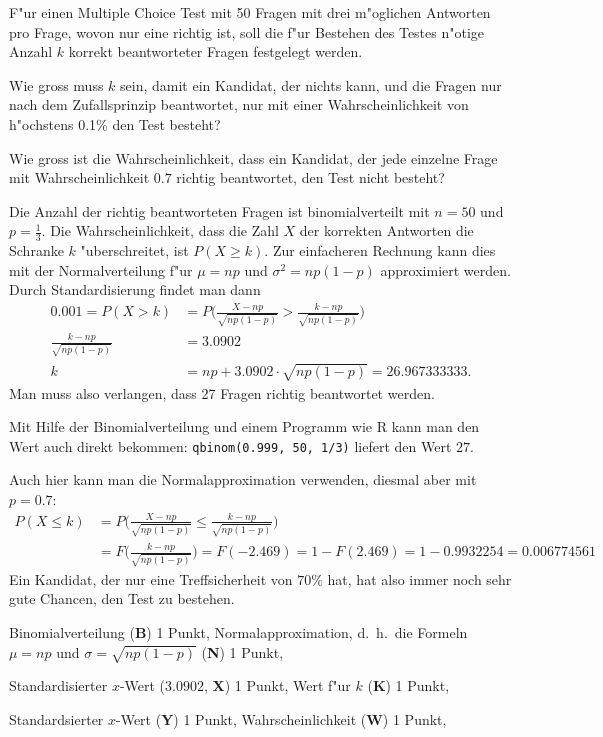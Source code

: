 F"ur einen Multiple Choice Test mit 50 Fragen mit drei m"oglichen Antworten
pro Frage, wovon nur eine richtig ist, soll die f"ur
Bestehen des Testes n"otige Anzahl $k$ korrekt beantworteter Fragen
festgelegt werden.
\begin{teilaufgaben}
\item Wie gross muss $k$ sein, damit ein Kandidat,
der nichts kann, und die Fragen nur nach dem Zufallsprinzip beantwortet,
nur mit einer Wahrscheinlichkeit von h"ochstens 0.1\% den Test besteht?
\item Wie gross ist die Wahrscheinlichkeit, dass ein Kandidat, der jede
einzelne Frage mit Wahrscheinlichkeit $0.7$ richtig beantwortet, den
Test nicht besteht?
\end{teilaufgaben}

\begin{loesung}
\begin{teilaufgaben}
\item Die Anzahl der richtig beantworteten Fragen ist binomialverteilt
mit $n=50$ und $p=\frac13$. Die Wahrscheinlichkeit, dass die Zahl $X$
der korrekten Antworten die Schranke $k$ "uberschreitet, ist $P(X\ge k)$.
Zur einfacheren Rechnung kann dies mit der Normalverteilung f"ur
$\mu = np$ und $\sigma^2=np(1-p)$ approximiert werden. Durch Standardisierung
findet man dann
\begin{align*}
0.001=P(X>k)
&=
P\biggl(
\frac{X-np}{\sqrt{np(1-p)}}>\frac{k-np}{\sqrt{np(1-p)}}
\biggr)
\\
\frac{k-np}{\sqrt{np(1-p)}}&=3.0902
\\
k&= np+3.0902\cdot \sqrt{np(1-p)}
=26.967333333.
\end{align*}
Man muss also verlangen, dass 27 Fragen richtig beantwortet werden.

Mit Hilfe der Binomialverteilung und einem Programm wie R kann man den
Wert auch direkt bekommen:
\texttt{qbinom(0.999, 50, 1/3)}
liefert den Wert $27$.
\item
Auch hier kann man die Normalapproximation verwenden, diesmal aber mit
$p=0.7$:
\begin{align*}
P(X\le k)&=
P\biggl(
\frac{X-np}{\sqrt{np(1-p)}}\le\frac{k-np}{\sqrt{np(1-p)}}
\biggr)
\\
&=F\biggl(
\frac{k-np}{\sqrt{np(1-p)}}
\biggr)
=F(-2.469)=1-F(2.469)=1-0.9932254=0.006774561
\end{align*}
Ein Kandidat, der nur eine Treffsicherheit von $70\%$ hat, hat also
immer noch sehr gute Chancen, den Test zu bestehen.
\end{teilaufgaben}
\end{loesung}

\begin{bewertung}
Binomialverteilung (\textbf{B}) 1 Punkt,
Normalapproximation, d.~h.~die Formeln $\mu=np$ und $\sigma=\sqrt{np(1-p)}$
(\textbf{N}) 1 Punkt,
\begin{teilaufgaben}
\item
Standardisierter $x$-Wert ($3.0902$, \textbf{X}) 1 Punkt,
Wert f"ur $k$ (\textbf{K}) 1 Punkt,
\item
Standardsierter $x$-Wert (\textbf{Y}) 1 Punkt,
Wahrscheinlichkeit (\textbf{W}) 1 Punkt,
\end{teilaufgaben}
\end{bewertung}

